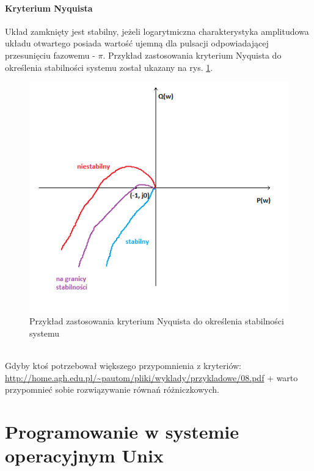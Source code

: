 \documentclass[a4paper,twoside]{report}
\begin{document}
\paragraph{Kryterium Nyquista\\}
Układ zamknięty jest stabilny, jeżeli logarytmiczna charakterystyka amplitudowa układu otwartego posiada wartość ujemną dla pulsacji odpowiadającej przesunięciu fazowemu - $\pi$. Przykład zastosowania kryterium Nyquista do określenia stabilności systemu został ukazany na rys. \ref{rys:dynamiczne_przyklad_nyquist}.
\begin{figure}[htbp]
	\centering
	\includegraphics[scale=0.7]{obrazy/dynamiczne/Przyklad_nyquist.png}
	\caption{Przykład zastosowania kryterium Nyquista do określenia stabilności systemu}
	\label{rys:dynamiczne_przyklad_nyquist}
\end{figure}
\\
Gdyby ktoś potrzebował większego przypomnienia z kryteriów: 
\href{http://home.agh.edu.pl/~pautom/pliki/wyklady/przykladowe/08.pdf}{\url{http://home.agh.edu.pl/~pautom/pliki/wyklady/przykladowe/08.pdf}}
+ warto przypomnieć sobie rozwiązywanie równań różniczkowych.


\section{Programowanie w systemie operacyjnym Unix}

\end{document}
